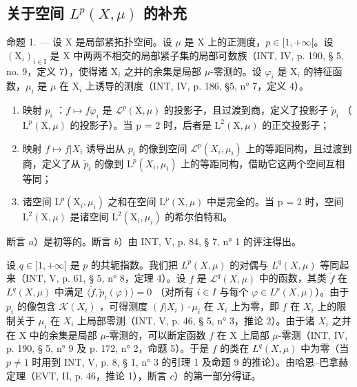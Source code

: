 \subsection{\texorpdfstring{关于空间 \(L^{p}(X,\mu)\) 的补充}{关于空间 L\^{}\{p\}(X,\textbackslash mu) 的补充}}

命题 1. --- 设 X 是局部紧拓扑空间。设 \(\mu\) 是 X 上的正测度，\(p \in [1, +\infty[\)。设 \((\mathrm{X}_i)_{i \in \mathrm{I}}\) 是 X 中两两不相交的局部紧子集的局部可数族（INT, IV, p. 190, § 5, no. 9，定义 7），使得诸 \(\mathrm{X}_i\) 之并的余集是局部 \(\mu\)-零测的。设 \(\varphi_i\) 是 \(\mathrm{X}_i\) 的特征函数，\(\mu_i\) 是 \(\mu\) 在 \(\mathrm{X}_i\) 上诱导的测度（INT, IV, p. 186, §5, n° 7，定义 4）。

\begin{enumerate}
\def\labelenumi{\alph{enumi})}
\item
  映射 \(p_{i}\) ：\(f \mapsto f\varphi_{i}\) 是 \(\mathcal{L}^{p}(\mathrm{X}, \mu)\) 的投影子，且过渡到商，定义了投影子 \(\widetilde{p}_{i}\) （\(\mathrm{L}^{p}(\mathrm{X}, \mu)\) 的投影子）。当 p = 2 时，后者是 \(\mathrm{L}^{2}(\mathrm{X}, \mu)\) 的正交投影子；
\item
  映射 \(f \mapsto f|X_i\) 诱导出从 \(p_i\) 的像到空间 \(\mathcal{L}^p(X_i, \mu_i)\) 上的等距同构，且过渡到商，定义了从 \(\widetilde{p}_i\) 的像到 \(\mathrm{L}^p(X_i, \mu_i)\) 上的等距同构，借助它这两个空间互相等同；
\item
  诸空间 \(\mathrm{L}^{p}(\mathrm{X}_{i},\mu_{i})\) 之和在空间 \(\mathrm{L}^{p}(\mathrm{X},\mu)\) 中是完全的。当 p = 2 时，空间 \(\mathrm{L}^{2}(\mathrm{X},\mu)\) 是诸空间 \(\mathrm{L}^{2}(\mathrm{X}_{i},\mu_{i})\) 的希尔伯特和。
\end{enumerate}

断言 \(a\)）是初等的。断言 \(b\)）由 INT, V, p. 84, § 7, n° 1 的评注得出。

设 \(q \in ]1, +\infty]\) 是 \(p\) 的共轭指数。我们把 \(L^p(X, \mu)\) 的对偶与 \(L^q(X, \mu)\) 等同起来（INT, V, p. 61, § 5, n° 8，定理 4）。设 \(f\) 是 \(\mathcal{L}^q(X, \mu)\) 中的函数，其类 \(\widetilde{f}\) 在 \(L^q(X, \mu)\) 中满足 \(\langle \widetilde{f}, \widetilde{p}_i(\varphi) \rangle = 0\) （对所有 \(i \in I\) 与每个 \(\varphi \in L^p(X, \mu)\)）。由于 \(p_i\) 的像包含 \(\mathcal{K}(X_i)\) ，可得测度 \((f|X_i) \cdot \mu_i\) 在 \(X_i\) 上为零，即 \(f\) 在 \(X_i\) 上的限制关于 \(\mu_i\) 在 \(X_i\) 上局部零测（INT, V, p. 46, § 5, n° 3，推论 2）。由于诸 \(X_i\) 之并在 X 中的余集是局部 \(\mu\)-零测的，可以断定函数 \(f\) 在 X 上局部 \(\mu\)-零测（INT, IV, p. 190, § 5, n° 9 及 p. 172, n° 2，命题 5）。于是 \(f\) 的类在 \(L^q(X, \mu)\) 中为零（当 \(p \neq 1\) 时用到 INT, V, p. 8, § 1, n° 3 的引理 1 及命题 9 的推论）。由哈恩--巴拿赫定理（EVT, II, p. 46，推论 1），断言 \(c\)）的第一部分得证。

